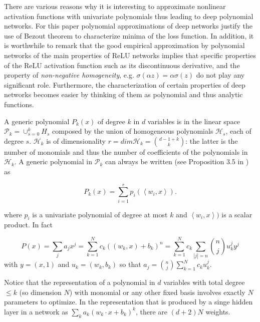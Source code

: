 \documentclass[10pt]{article}
\providecommand{\scal}[2]{\left\langle{#1},{#2}\right\rangle}
\begin{document}
There are various reasons why it is interesting to approximate
nonlinear activation functions with univariate polynomials thus
leading to deep polynomial networks. For this paper polynomial
approximations of deep networks justify the use of Bezout theorem to
characterize minima of the loss function. In addition, it is
worthwhile to remark that the good empirical approximation by
polynomial networks of the main properties of ReLU networks implies
that specific properties of the ReLU activation function such as its
discontinuous derivative, and the property of {\it non-negative
  homogeneity}, e.g. $\sigma(\alpha z) = \alpha \sigma(z)$ do not play
any significant role. Furthermore, the characterization of certain
properties of deep networks becomes easier by thinking of them as
polynomial and thus analytic functions.

A generic polynomial $P_k(x)$ of degree $k$ in $d$ variables is in the
linear space $\mathcal{P}_k = \cup_{s=0}^k H_s$ composed by the union
of homogeneous polynomials $\mathcal{H}_s$, each of degree $s$.
$\mathcal{H}_k$ is of dimensionality
$r= dim \mathcal{H}_k= \binom{d-1+k}{k}$: the latter is the number of
monomials and thus the number of coefficients of the polynomials in
$\mathcal{H}_k$. A generic polynomial in $\mathcal{P}_k$ can always be
written (see Proposition 3.5 in \cite{Mhaskar1993}) as

\begin{equation}
P_k(x) = \sum _{i=1}^r p_i (\scal{w_i}{x}).
\label{Linea}
\end{equation}

\noindent where $p_i$ is a  univariate polynomial of degree at most
$k$ and $\scal{w_i}{x})$ is a scalar product. In fact

\begin{equation}
P(x) = \sum _j a_j x^j = \sum _{k=1}^N c_k ((w_k, x)+b_k)^n = \sum_{k=1}^N c_k \sum_{|j|=n} \binom{n}{j}
u^j_k y^j
\label{HMhaskar}
\end{equation}
\noindent with $y=(x,1)$ and $u_k=(w_k, b_k)$ so that $a_j= \binom{n}{j}
\sum_{k=1}^N c_k u_k^j.$

Notice that the representation of a polynomial in $d$ variables with
total degree $\leq k$ (so dimension $N$) with monomial or any other
fixed basis involves exactly $N$ parameters to optimize. In the
representation that is produced by a singe hidden layer in a network
as $\sum_k a_k (w_k\cdot x+b_k)^k$, there are $(d+2) N$ weights.
\end{document}
